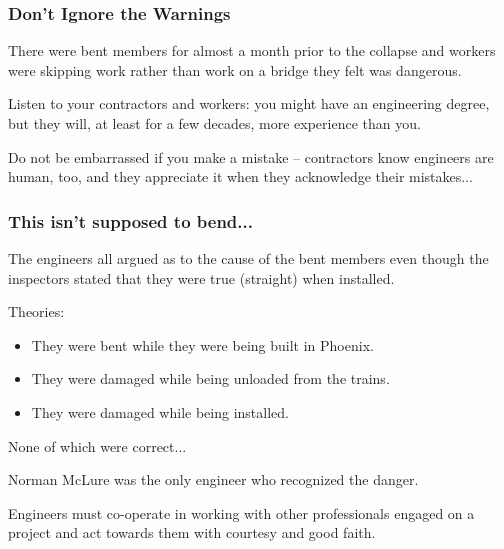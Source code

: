 \begin{frame}
\frametitle{Don't Ignore the Warnings}

There were bent members for almost a month prior to the collapse and workers were skipping work rather than work on a bridge they felt was dangerous.


Listen to your contractors and workers:  you might have an engineering degree, but they will, at least for a few decades, more experience than you.

Do not be embarrassed if you make a mistake -- contractors know engineers are human, too, and they appreciate it when they acknowledge their mistakes...

\end{frame}



\begin{frame}
\frametitle{This isn't supposed to bend...}

The engineers all argued as to the cause of the bent members even though the inspectors stated that they were true (straight) when installed.

Theories:
\begin{itemize}
 \item They were bent while they were being built in Phoenix.
 \item They were damaged while being unloaded from the trains.
 \item They were damaged while being installed.
\end{itemize}

None of which were correct...

Norman McLure was the only engineer who recognized the danger.

Engineers must co-operate in working with other professionals engaged on a project and act towards them with courtesy and good faith.

\end{frame}



